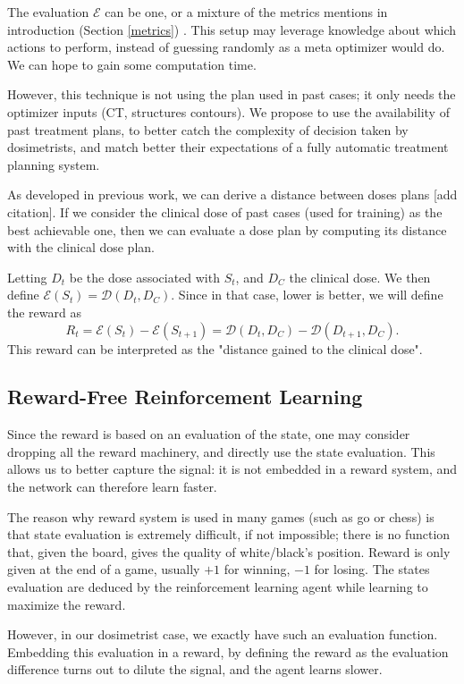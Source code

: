 The evaluation $\mathcal{E}$ can be one, or a mixture of the metrics mentions in introduction (Section \ref{metrics}) \cite{shen_hierarchical_2021} \cite{shen_intelligent_2019} \cite{moreau_reinforcement_2021}.
This setup may leverage knowledge about which actions to perform, instead of guessing randomly as a meta optimizer would do.
We can hope to gain some computation time.

However, this technique is not using the plan used in past cases; it only needs the optimizer inputs (CT, structures contours).
We propose to use the availability of past treatment plans, to better catch the complexity of decision taken by dosimetrists, and match better their expectations of a fully automatic treatment planning system.

As developed in previous work, we can derive a distance between doses plans [add citation].
If we consider the clinical dose of past cases (used for training) as the best achievable one, then we can evaluate a dose plan by computing its distance with the clinical dose plan.

Letting $D_t$ be the dose associated with $S_t$, and $D_C$ the clinical dose.
We then define $\mathcal{E}(S_t) = \mathcal{D}(D_t, D_C)$.
Since in that case, lower is better, we will define the reward as $$R_t = \mathcal{E}(S_t) - \mathcal{E}(S_{t+1}) = \mathcal{D}(D_t, D_C) - \mathcal{D}(D_{t+1}, D_C).$$
This reward can be interpreted as the "distance gained to the clinical dose".


\subsection{Reward-Free Reinforcement Learning}

Since the reward is based on an evaluation of the state, one may consider dropping all the reward machinery, and directly use the state evaluation.
This allows us to better capture the signal: it is not embedded in a reward system, and the network can therefore learn faster.

The reason why reward system is used in many games (such as go or chess) is that state evaluation is extremely difficult, if not impossible; there is no function that, given the board, gives the quality of white/black's position.
Reward is only given at the end of a game, usually $+1$ for winning, $-1$ for losing.
The states evaluation are deduced by the reinforcement learning agent while learning to maximize the reward.

However, in our dosimetrist case, we exactly have such an evaluation function.
Embedding this evaluation in a reward, by defining the reward as the evaluation difference turns out to dilute the signal, and the agent learns slower.



